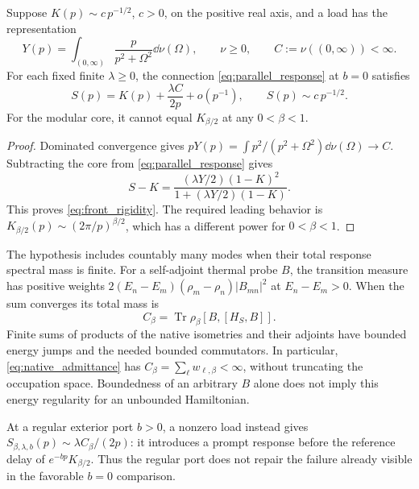 \begin{proposition}
\label{prop:front_rigidity}
Suppose $K(p)\sim c\,p^{-1/2}$, $c>0$, on the positive real axis,
and a load has the representation
\begin{equation}
 Y(p)=\int_{(0,\infty)}\frac{p}{p^2+\Omega^2}\dd\nu(\Omega),
 \qquad \nu\ge0,\qquad C:=\nu((0,\infty))<\infty.
 \label{eq:finite_spectral_mass}
\end{equation}
For each fixed finite $\lambda\ge0$, the connection
\eqref{eq:parallel_response} at $b=0$ satisfies
\begin{equation}
 S(p)=K(p)+\frac{\lambda C}{2p}+o(p^{-1}),\qquad
 S(p)\sim c\,p^{-1/2}.
 \label{eq:front_rigidity}
\end{equation}
For the modular core, it cannot equal $K_{\beta/2}$ at any
$0<\beta<1$.
\end{proposition}
\begin{proof}
Dominated convergence gives
$pY(p)=\int p^2/(p^2+\Omega^2)\dd\nu(\Omega)\to C$.
Subtracting the core from \eqref{eq:parallel_response} gives
\begin{equation}
 S-K=\frac{(\lambda Y/2)(1-K)^2}{1+(\lambda Y/2)(1-K)}.
\end{equation}
This proves \eqref{eq:front_rigidity}. The required leading behavior is
$K_{\beta/2}(p)\sim(2\pi/p)^{\beta/2}$, which has a different power
for $0<\beta<1$.
\end{proof}

The hypothesis includes countably many modes when their total response
spectral mass is finite. For a self-adjoint thermal probe $B$, the
transition measure has positive weights
$2(E_n-E_m)(\rho_m-\rho_n)|B_{mn}|^2$ at $E_n-E_m>0$.
When the sum converges its total mass is
\begin{equation}
 C_\beta=\operatorname{Tr}\rho_\beta[B,[H_S,B]].
\end{equation}
Finite sums of products of the native isometries and their adjoints
have bounded energy jumps and the needed bounded commutators. In
particular, \eqref{eq:native_admittance} has
$C_\beta=\sum_\ell w_{\ell,\beta}<\infty$, without truncating the
occupation space. Boundedness of an arbitrary $B$ alone does not
imply this energy regularity for an unbounded Hamiltonian.

At a regular exterior port $b>0$, a nonzero load instead gives
$S_{\beta,\lambda,b}(p)\sim\lambda C_\beta/(2p)$: it introduces a
prompt response before the reference delay of
$e^{-bp}K_{\beta/2}$. Thus the regular port does not repair the failure
already visible in the favorable $b=0$ comparison.

